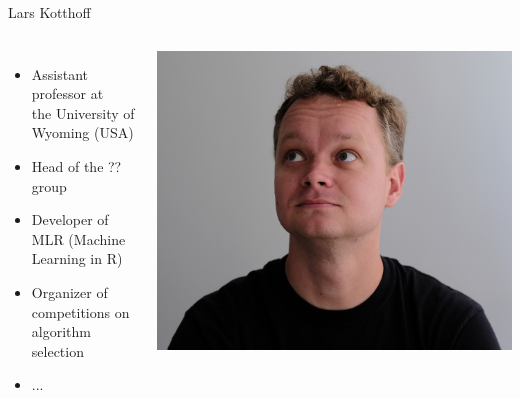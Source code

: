 \begin{frame}[c]{Lars Kotthoff}

\begin{columns}
	
	
	\begin{itemize}
		\item Assistant professor at\\ the University of Wyoming (USA)
		\item Head of the ?? group
		\item Developer of MLR (Machine Learning in R)
		\item Organizer of competitions on algorithm selection
		\item ...
	\end{itemize}
	
	
	\includegraphics[width=1.0\textwidth]{images/kotthoff.jpg}
	
\end{columns}

\end{frame}
